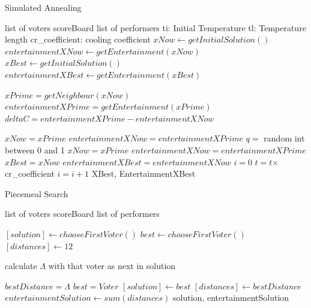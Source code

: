 \documentclass[12pt]{report}
\begin{document}
\begin{algorithm}
\caption{Simulated Annealing}
\label{simAnnealingPseudocode}
\begin{algorithmic}[1]
\REQUIRE list of voters
\REQUIRE scoreBoard
\REQUIRE list of performers
\REQUIRE ti: Initial Temperature
\REQUIRE tl: Temperature length
\REQUIRE cr\_coefficient: cooling coefficient
\STATE $xNow \leftarrow getInitialSolution()$
\STATE $entertainmentXNow \leftarrow getEntertainment(xNow)$
\STATE $xBest \leftarrow getInitialSolution()$
\STATE $entertainmentXBest \leftarrow getEntertainment(xBest)$

\STATE $xPrime = getNeighbour(xNow)$
\STATE $entertainmentXPrime = getEntertainment(xPrime)$
\STATE $deltaC = entertainmentXPrime - entertainmentXNow$

\STATE $xNow = xPrime$
\STATE $entertainmentXNow = entertainmentXPrime$
\ELSE
\STATE$q = $ random int between 0 and 1
\STATE $xNow = xPrime$
\STATE $entertainmentXNow = entertainmentXPrime$
\ENDIF
\ENDIF
{}
\STATE $xBest = xNow$
\STATE $entertainmentXBest = entertainmentXNow$
\STATE $i = 0$
\ENDIF
\ENDFOR
\STATE $t = t $$\times$cr\_coefficient
\STATE $i = i + 1$
\ENDWHILE
\RETURN XBest, EntertainmentXBest
\end{algorithmic}
\end{algorithm}

\begin{algorithm}
\caption{Piecemeal Search}
\label{piecemealPseudocode}
\begin{algorithmic}[1]
\REQUIRE list of voters
\REQUIRE scoreBoard
\REQUIRE list of performers

\STATE $[solution] \leftarrow chooseFirstVoter()$
\STATE $best \leftarrow chooseFirstVoter()$
\STATE $[distances] \leftarrow 12$

\STATE calculate $\Lambda$ with that voter as next in solution

\STATE $bestDistance= \Lambda$
\STATE $best = Voter$
\ENDIF
\ENDFOR
\STATE $[solution] \leftarrow best$
\STATE $[distances] \leftarrow bestDistance$
\ENDFOR
\STATE $entertainmentSolution \leftarrow sum(distances)$
\RETURN solution, entertainmentSolution
\end{algorithmic}
\end{algorithm}
\end{document}

